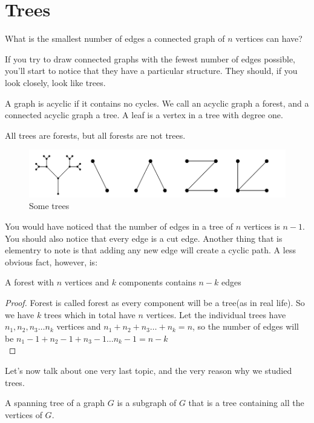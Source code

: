 \section{Trees}
\begin{example}
    What is the smallest number of edges a connected graph of $n$ vertices can have?
\end{example}
If you try to draw connected graphs with the fewest number of edges possible, you’ll start to notice that they have a particular structure. They should, if you look closely, look like trees. \\
\begin{definition}
    A graph is acyclic if it contains no cycles. We call an acyclic graph a forest, and a connected acyclic graph a tree. A leaf is a vertex in a tree with degree one.
\end{definition}
All trees are forests, but all forests are not trees.\\
\begin{figure}[h]
    \centering
    \includegraphics[width=0.5\linewidth]{Photos/trees.png}
    \caption{Some trees}    
\end{figure}
You would have noticed that the number of edges in a tree of $n$ vertices is $n-1$.  You should also notice that every edge is a cut edge. Another thing that is elementry to note is that adding any new edge will create a cyclic path. A less obvious fact, however, is:\\
\begin{theorem}
    A forest with $n$ vertices and $k$ components contains $n - k$ edges
\end{theorem}
\begin{proof}
    Forest is called forest as every component will be a tree(as in real life). So we have $k$ trees which in total have $n$ vertices. Let the individual trees have $n_1, n_2, n_3 \dots n_k$ vertices and $n_1+n_2+n_3\dots +n_k=n$, so the number of edges will be $n_1 -1 +n_2 -1 + n_3 -1 \dots n_k -1= n-k$\\
\end{proof}
Let's now talk about one very last topic, and the very reason why we studied trees.
\begin{definition}
    A spanning tree of a graph $G$ is a subgraph of $G$ that is a tree containing all the vertices of $G$.
\end{definition}

